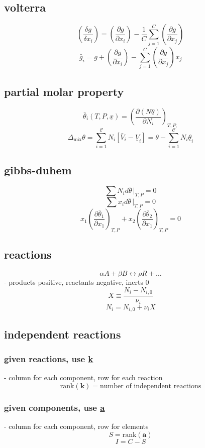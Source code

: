 \documentclass{article}
\begin{document}
\subsection*{volterra}
\[\left(\frac{ \delta g }{ \delta x_{i} } \right) = \left(\frac{ \partial g }{ \partial x_{i} } \right)_{} - \frac{1}{C} \sum_{j=1}^{C} \left(\frac{ \partial g }{ \partial x_{j} } \right)_{}  \]
\[\bar{g}_{i} = g + \left(\frac{ \partial g }{ \partial x_{i} } \right)_{} - \sum_{j=1}^C \left(\frac{ \partial g }{ \partial x_{j} } \right)_{} x_{j}   \]
\subsection*{partial molar property} 
\[ \bar{\theta}_i (T,P,\underline{x}) = \left( \frac{\partial ( N\underline\theta)}{\partial N_i} \right)_{T,P,} \]
\[{ \Delta_{\text{mix}} \theta = \sum_{i=1}^{\mathcal{C}} N_i \left[ \bar V_i - \underline V_i \right] } = \theta - \sum_{i=1}^{\mathcal{C}} N_i \underline\theta_i \]
\subsection*{gibbs-duhem}
\[ \sum N_{i} d\bar{\theta}\,\bigl\lvert_{T,P} = 0  \]
\[ \sum x_{i} d\bar{\theta}\,\bigl\lvert_{T,P} = 0 \]
\[x_{1}\left(\frac{ \partial \bar{\theta}_{1} }{ \partial x_{1} } \right)_{T,P} +x_{2}\left(\frac{ \partial \bar{\theta}_{2} }{ \partial x_{1} } \right)_{T,P} = 0\]
\subsection*{reactions}
\[\alpha A + \beta B \longleftrightarrow \rho R + \dots\]
- products positive, reactants negative, inerts 0
\[X \equiv \frac{N_{i} - N_{i,0}}{\nu_{i}}\]
\[N_{i} = N_{i,0} + \nu_{i}X\]
\subsection*{independent reactions}
\subsubsection*{given reactions, use \underline{\underline{k}}}
- column for each component, row for each reaction
\[\text{rank}(\mathbf{k}) = \text{number of independent reactions}\]
\subsubsection*{given components, use \underline{\underline{a}}}
- column for each component, row for elements
\[S = \text{rank}(\mathbf{a})\]
\[I = C - S\]
\end{document}
